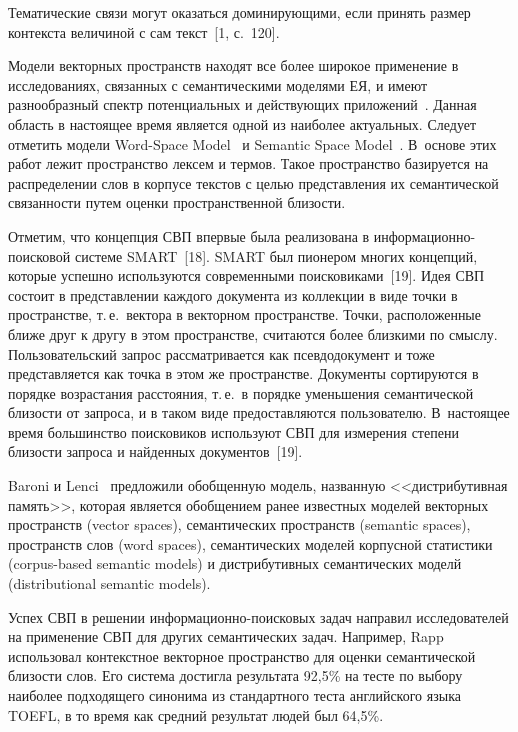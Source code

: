 \begin{multicols}{2}
Тематические  связи могут оказаться доминирующими, если принять размер контекста 
величиной с сам текст~[1, с.~120]. 
     
     Модели векторных пространств находят все более широкое 
применение в исследованиях, связанных с семантическими моделями 
ЕЯ, и имеют разнообразный спектр потенциальных и 
действующих приложений~\cite{1-koz, 4-koz}. Данная область в настоящее 
время является одной из наиболее актуальных. Следует отметить модели 
Word-Space Model~\cite{16-koz} и Semantic Space Model~\cite{17-koz}. 
В~основе этих работ лежит пространство лексем и термов. Такое 
пространство базируется на распределении слов в корпусе текстов с целью 
представления их семантической связанности путем оценки 
пространственной близости. 
     
     Отметим, что концепция СВП впервые была реализована в информационно-поисковой системе 
SMART~[18]. SMART был пионером многих концепций, которые успешно 
используются современными поисковиками~[19]. Идея СВП состоит в 
представлении каждого документа из коллекции в виде точки в 
пространстве, т.\,е.\ вектора в векторном пространстве. Точки, 
расположенные ближе друг к другу в этом пространстве, считаются более 
близкими по смыслу. Пользовательский запрос рассматривается как 
псевдодокумент и тоже представляется как точка в этом же пространстве. 
Документы сортируются в порядке возрастания расстояния, т.\,е.\ в 
порядке уменьшения семантической близости от запроса, и в таком виде 
предоставляются пользователю. В~настоящее время большинство 
поисковиков используют СВП для измерения степени близости запроса и 
найденных документов~[19].
     
Baroni и Lenci~\cite{2-koz} предложили обобщенную модель, 
названную <<дистрибутивная память>>, которая является обобщением 
ранее известных моделей векторных пространств (vector spaces), 
семантических пространств (semantic spaces), пространств слов (word 
spaces), семантических моделей корпусной статистики (corpus-based 
semantic models) и дистрибутивных семантических моделй (distributional 
semantic models). 
     
     Успех СВП в решении ин\-фор\-ма\-ци\-он\-но-по\-иско\-вых задач 
направил исследователей на применение СВП для других семантических 
задач. Например, Rapp~\cite{3-koz} использовал контекстное 
векторное пространство для оценки семантической близости слов. Его 
система достигла результата 92,5\% на тес\-те по выбору наиболее 
подходящего синонима из стандартного тес\-та английского языка TOEFL, в 
то время как средний результат людей был 64,5\%.
     

\end{multicols}
